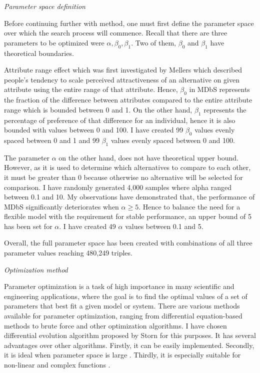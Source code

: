 \documentclass[a4paper,12pt]{article}
\newcommand{\citeyearonly}[1]{\citeyearpar{#1}}
\begin{document}
\textit{Parameter space definition}

Before continuing further with method, one must first define the parameter space over which the search process will commence. Recall that there are three parameters to be optimized were $\alpha, \beta_0, \beta_1$. Two of them, $\beta_0$ and $\beta_1$ have theoretical boundaries. 

Attribute range effect which was first investigated by Mellers \citeyearonly{mellers1994trade} which described people's tendency to scale perceived attractiveness of an alternative on given attribute using the entire range of that attribute. Hence, $\beta_0$ in MDbS represents the fraction of the difference between attributes compared to the entire attribute range which is bounded between 0 and 1. On the other hand, $\beta_1$ represents the percentage of preference of that difference for an individual, hence it is also bounded with values between 0 and 100. I have created 99 $\beta_0$ values evenly spaced between 0 and 1 and 99 $\beta_1$ values evenly spaced between 0 and 100.

The parameter $\alpha$ on the other hand, does not have theoretical upper bound. However, as it is used to determine which alternatives to compare to each other, it must be greater than 0 because otherwise no alternative will be selected for comparison. I have randomly generated 4,000 samples where alpha ranged between 0.1 and 10. My observations have demonstrated that, the performance of MDbS significantly deteriorates when $\alpha \ge 5$. Hence to balance the need for a flexible model with the requirement for stable performance, an upper bound of 5 has been set for $\alpha$. I have created 49 $\alpha$ values between 0.1 and 5.

Overall, the full parameter space has been created with combinations of all three parameter values reaching 480,249 triples.

\textit{Optimization method}

Parameter optimization is a task of high importance in many scientific and engineering applications, where the goal is to find the optimal values of a set of parameters that best fit a given model or system. There are various methods available for parameter optimization, ranging from differential equation-based methods to brute force and other optimization algorithms. I have chosen differential evolution algorithm proposed by Storn \citeyearonly{storn1997differential} for this purposes. It has several advantages over other algorithms. Firstly, it can be easily implemented. Secondly, it is ideal when parameter space is large \citep{lin2019applying}. Thirdly, it is  especially suitable for non-linear and complex functions \citep{omran2009bare}. 
\end{document}
